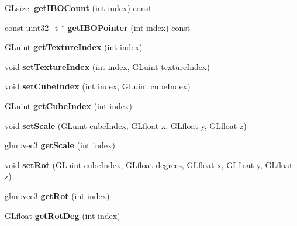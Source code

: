 \begin{DoxyCompactItemize}
G\+Lsizei {\bfseries get\+I\+B\+O\+Count} (int index) const
\item 
\mbox{\label{classglimac_1_1CubeList_af52e02f29a9b4a13418cf4e90eec2562}} 
const uint32\+\_\+t $\ast$ {\bfseries get\+I\+B\+O\+Pointer} (int index) const
\item 
\mbox{\label{classglimac_1_1CubeList_a5be943e092e11ae9a2b4f045cc368bc0}} 
G\+Luint {\bfseries get\+Texture\+Index} (int index)
\item 
\mbox{\label{classglimac_1_1CubeList_ae016eb0b09350a67129d265aad1ba62e}} 
void {\bfseries set\+Texture\+Index} (int index, G\+Luint texture\+Index)
\item 
\mbox{\label{classglimac_1_1CubeList_a6c10e49604014aa116a315aacbe6c850}} 
void {\bfseries set\+Cube\+Index} (int index, G\+Luint cube\+Index)
\item 
\mbox{\label{classglimac_1_1CubeList_a478146f5afac2969a3ad1ac698f82233}} 
G\+Luint {\bfseries get\+Cube\+Index} (int index)
\item 
\mbox{\label{classglimac_1_1CubeList_ab17bd322f6e0cdbd47dcbd223d1d8a64}} 
void {\bfseries set\+Scale} (G\+Luint cube\+Index, G\+Lfloat x, G\+Lfloat y, G\+Lfloat z)
\item 
\mbox{\label{classglimac_1_1CubeList_a971af62dbe232b6f892950877b473ce8}} 
glm\+::vec3 {\bfseries get\+Scale} (int index)
\item 
\mbox{\label{classglimac_1_1CubeList_a5467702fb89dddbe2de895f8084e6bf3}} 
void {\bfseries set\+Rot} (G\+Luint cube\+Index, G\+Lfloat degrees, G\+Lfloat x, G\+Lfloat y, G\+Lfloat z)
\item 
\mbox{\label{classglimac_1_1CubeList_a3e5204a3a5dcbd5dba00f6c698e14b65}} 
glm\+::vec3 {\bfseries get\+Rot} (int index)
\item 
\mbox{\label{classglimac_1_1CubeList_a2fcc0c5d9cb7b132470f59184523fa52}} 
G\+Lfloat {\bfseries get\+Rot\+Deg} (int index)

\end{DoxyCompactItemize}
